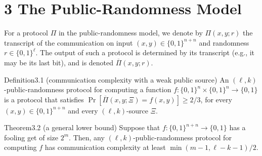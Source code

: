 \section*{3 The Public-Randomness Model}
For a protocol $\Pi$ in the public-randomness model, we denote by $\Pi(x,y;r)$ the transcript of the communication on input $(x,y)\in\{0,1\}^{n+n}$ and randomness $r\in\{0,1\}^\ell$. The output of such a protocol is determined by its transcript (e.g., it may be its last bit), and is denoted $\overline\Pi(x,y;r)$.
\begin{authorclaim}{Definition3.1 (communication complexity with a weak public source)}
An $(\ell,k)$-public-randomness protocol for computing a function $f:\{0,1\}^n\times\{0,1\}^n\to\{0,1\}$ is a protocol that satisfies $\Pr[\overline\Pi(x,y;\Xi)=f(x,y)]\ge2/3$, for every $(x,y)\in\{0,1\}^{n+n}$ and every $(\ell,k)$-source $\Xi$.
\end{authorclaim}
\begin{authorclaim}{Theorem3.2 (a general lower bound)}
Suppose that $f:\{0,1\}^{n+n}\to\{0,1\}$ has a fooling get of size $2^m$. Then, any $(\ell,k)$-public-randomness protocol for computing $f$ has communication complexity at least $\min(m-1,\ell-k-1)/2$.
\end{authorclaim}
